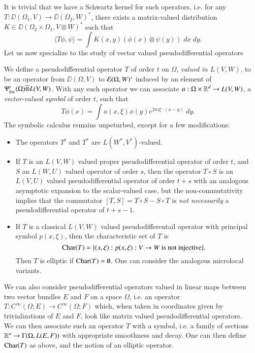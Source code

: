 It is trivial that we have a Schwartz kernel for such operators, i.e. for any $T: \DD(\Omega_1,V) \to \DD(\Omega_2,W)^*$, there exists a matrix-valued distribution $K \in \DD(\Omega_2 \times \Omega_1, V \otimes W)^*$ such that
%
\[ \langle T \phi, \psi \rangle = \int K(x,y) (\phi(x) \otimes \psi(y))\; dx\; dy. \]
%
Let us now specialize to the study of vector valued pseudodifferential operators

We define a pseudodifferential operator $T$ of order $t$ on $\Omega$, \emph{valued in $L(V,W)$}, to be an operator from $\DD(\Omega,V)$ to $\operatorname{\mathcal{E}}(\Omega,W)^*$ induced by an element of $\Psi^t_{\text{loc}}(\Omega) \widehat{\otimes} L(V,W)$. With any such operator we can associate $a: \Omega \times \operatorname{\mathbb{R}}^d \to L(V,W)$, a \emph{vector-valued symbol} of order $t$, such that
%
\[ T\phi(x) = \int a(x,\xi) \phi(y) e^{2 \pi i \xi \cdot (x-y)}\; dy. \]
%
The symbolic calculus remains unpeturbed, except for a few modifications:
%
\begin{itemize}
    \item The operators $T^t$ and $T^*$ are $L(W^*,V^*)$-valued.

    \item If $T$ is an $L(V,W)$ valued proper pseudodifferential operator of order $t$, and $S$ an $L(W,U)$ valued operator of order $s$, then the operator $T \circ S$ is an $L(V,U)$ valued pseudodifferential operator of order $t + s$ with an analogous asymptotic expansion to the scalar-valued case, but the non-commutativity implies that the commutator $[T,S] = T \circ S - S \circ T$ is \emph{not necessarily} a pseudodifferential operator of $t + s - 1$.

    \item If $T$ is a classical $L(V,W)$ valued pseudodifferentail operator with principal symbol $p(x,\xi)$, then the characteristic set of $T$ is
    \[ \operatorname{\text{Char}}(T) = \{ (x,\xi): p(x,\xi): V \to W\ \text{is not injective} \}. \]
    Then $T$ is elliptic if $\operatorname{\text{Char}}(T) = \emptyset$. One can consider the analogous microlocal variants.
\end{itemize}

We can also consider pseudodifferential operators valued in linear maps between two vector bundles $E$ and $F$ on a space $\Omega$, i.e. an operator $T: C^\infty(\Omega;E) \to C^\infty(\Omega;F)$ which, when taken in coordinates given by trivializations of $E$ and $F$, look like matrix valued pseudodifferential operators. We can then associate such an operator $T$ with a symbol, i.e. a family of sections $\operatorname{\mathbb{R}}^n \to \Gamma(\Omega, L(E,F))$ with appropriate smoothness and decay. One can then define $\operatorname{\text{Char}}(T)$ as above, and the notion of an elliptic operator.

